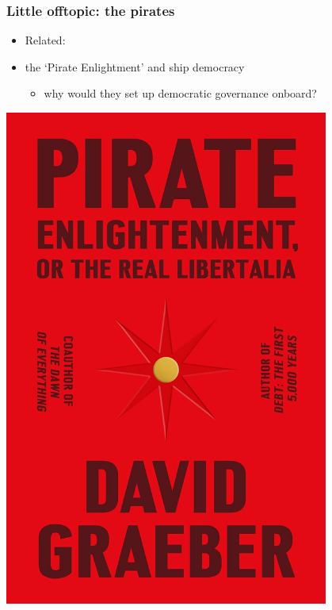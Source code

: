 \documentclass[aspectratio=43, handout]{beamer}
\begin{document}
\begin{frame}
\frametitle{Little offtopic: the pirates}
\centering

\begin{minipage}{.49\textwidth}\centering
\begin{itemize}
  \item Related:
  \item[] the `Pirate Enlightment' and ship democracy
    \begin{itemize}
    \item why would they set up democratic governance onboard?
  \end{itemize}
\end{itemize}
\end{minipage}\hfill
\begin{minipage}{.49\textwidth}\centering
  \includegraphics[width = 0.8\textwidth]{img/pirate_enlightment}
\end{minipage}
  
\end{frame}
\end{document}
